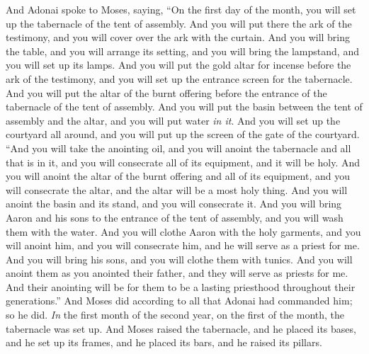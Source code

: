 \begin{biblechapter} %
 And Adonai spoke to Moses, saying,
\verse “On the first day of the month, you will set up the tabernacle of the tent of assembly.
\verse And you will put there the ark of the testimony, and you will cover over the ark with the curtain.
\verse And you will bring the table, and you will arrange its setting, and you will bring the lampstand, and you will set up its lamps.
\verse And you will put the gold altar for incense before the ark of the testimony, and you will set up the entrance screen for the tabernacle.
\verse And you will put the altar of the burnt offering before the entrance of the tabernacle of the tent of assembly.
\verse And you will put the basin between the tent of assembly and the altar, and you will put water \textit{in it}.
\verse And you will set up the courtyard all around, and you will put up the screen of the gate of the courtyard.
\verse “And you will take the anointing oil, and you will anoint the tabernacle and all that is in it, and you will consecrate all of its equipment, and it will be holy.
\verse And you will anoint the altar of the burnt offering and all of its equipment, and you will consecrate the altar, and the altar will be a most holy thing.
\verse And you will anoint the basin and its stand, and you will consecrate it.
\verse And you will bring Aaron and his sons to the entrance of the tent of assembly, and you will wash them with the water.
\verse And you will clothe Aaron with the holy garments, and you will anoint him, and you will consecrate him, and he will serve as a priest for me.
\verse And you will bring his sons, and you will clothe them with tunics.
\verse And you will anoint them as you anointed their father, and they will serve as priests for me. And their anointing will be for them to be a lasting priesthood throughout their generations.”
\verse And Moses did according to all that Adonai had commanded him; so he did.
\verse \textit{In} the first month of the second year, on the first of the month, the tabernacle was set up.
\verse And Moses raised the tabernacle, and he placed its bases, and he set up its frames, and he placed its bars, and he raised its pillars.

\end{biblechapter}
